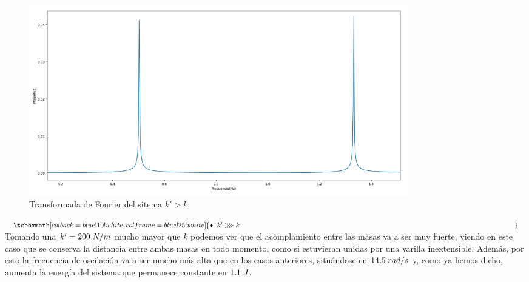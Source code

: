 \documentclass{article}
\begin{document}
\begin{figure}[H]
    \centering
    \includegraphics[width=0.8\textwidth]{fourier_k_mayor}
\caption{Transformada de Fourier del sitema $k'>k$}
\label{fig:f1}
\end{figure}
\vspace{2cm}
\noindent$\tcboxmath[colback=blue!10!white,colframe=blue!25!white]{\bullet\hspace{0.2cm} k'\ggg k\hspace{14cm}}\label{ec.:4}$\newline\linebreak
Tomando una $k' = 200\hspace{0.1cm}N/m$ mucho mayor que $k$ podemos ver que el acomplamiento entre las masas va a ser muy fuerte, viendo en este caso que se conserva la distancia entre ambas masas en todo momento, como si estuvieran unidas por una varilla inextensible. Además, por esto la frecuencia de oscilación va a ser mucho más alta que en los casos anteriores, situándose en $14.5\hspace{0.1cm}rad/s$ y, como ya hemos dicho, aumenta la energía del sistema que permanece constante en $1.1\hspace{0.1cm}J$.
\end{document}
